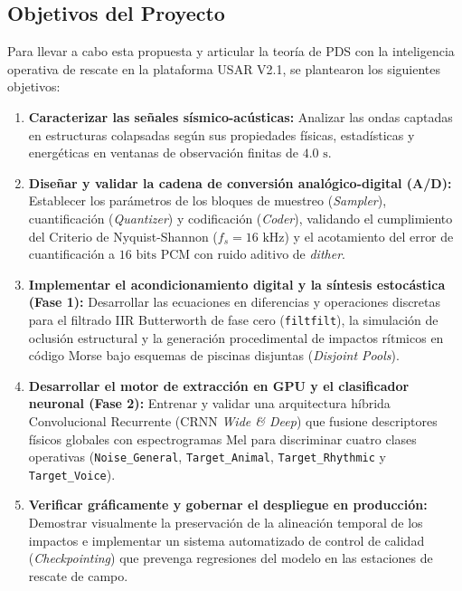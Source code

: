 \documentclass[11pt, a4paper]{article}
\begin{document}
\subsection{Objetivos del Proyecto}
Para llevar a cabo esta propuesta y articular la teoría de PDS con la inteligencia operativa de rescate en la plataforma USAR V2.1, se plantearon los siguientes objetivos:
\begin{enumerate}
    \item \textbf{Caracterizar las señales sísmico-acústicas:} Analizar las ondas captadas en estructuras colapsadas según sus propiedades físicas, estadísticas y energéticas en ventanas de observación finitas de $4.0\text{ s}$.
    \item \textbf{Diseñar y validar la cadena de conversión analógico-digital (A/D):} Establecer los parámetros de los bloques de muestreo (\textit{Sampler}), cuantificación (\textit{Quantizer}) y codificación (\textit{Coder}), validando el cumplimiento del Criterio de Nyquist-Shannon ($f_s = 16\text{ kHz}$) y el acotamiento del error de cuantificación a $16\text{ bits}$ PCM con ruido aditivo de \textit{dither}.
    \item \textbf{Implementar el acondicionamiento digital y la síntesis estocástica (Fase 1):} Desarrollar las ecuaciones en diferencias y operaciones discretas para el filtrado IIR Butterworth de fase cero (\texttt{filtfilt}), la simulación de oclusión estructural y la generación procedimental de impactos rítmicos en código Morse bajo esquemas de piscinas disjuntas (\textit{Disjoint Pools}).
    \item \textbf{Desarrollar el motor de extracción en GPU y el clasificador neuronal (Fase 2):} Entrenar y validar una arquitectura híbrida Convolucional Recurrente (CRNN \textit{Wide \& Deep}) que fusione descriptores físicos globales con espectrogramas Mel para discriminar cuatro clases operativas (\texttt{Noise\_General}, \texttt{Target\_Animal}, \texttt{Target\_Rhythmic} y \texttt{Target\_Voice}).
    \item \textbf{Verificar gráficamente y gobernar el despliegue en producción:} Demostrar visualmente la preservación de la alineación temporal de los impactos e implementar un sistema automatizado de control de calidad (\textit{Checkpointing}) que prevenga regresiones del modelo en las estaciones de rescate de campo.
\end{enumerate}
\end{document}
